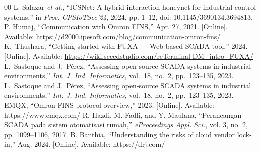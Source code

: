 \documentclass[conference]{IEEEtran}
\begin{document}
\begin{thebibliography}{00}
 L. Salazar \textit{et al.}, ``ICSNet: A hybrid-interaction honeynet for industrial control systems,'' in \textit{Proc. CPSIoTSec’24}, 2024, pp. 1–12, doi: 10.1145/3690134.3694813.
 P. Humaj, ``Communication with Omron FINS,'' Apr. 27, 2021. [Online]. Available: https://d2000.ipesoft.com/blog/communication-omron-fins/
 K.~Thushara, ``Getting started with FUXA — Web based SCADA tool,'' 2024. [Online]. Available: \url{https://wiki.seeedstudio.com/reTerminal-DM_intro_FUXA/}
 L.~Sastoque and J.~Pérez, ``Assessing open-source SCADA systems in industrial environments,''
\textit{Int. J. Ind. Informatics}, vol.~18, no.~2, pp.~123--135, 2023.
L.~Sastoque and J.~Pérez, ``Assessing open-source SCADA systems in industrial environments,'' 
\textit{Int. J. Ind. Informatics}, vol.~18, no.~2, pp.~123--135, 2023.
 EMQX, ``Omron FINS protocol overview,'' 2023. [Online]. Available: https://www.emqx.com/
 R. Hazdi, M. Fadli, and Y. Maulana, ``Perancangan SCADA pada sistem otomatisasi rumah,'' \textit{eProceedings Appl. Sci.}, vol. 3, no. 2, pp. 1099–1106, 2017.
 B. Banthia, ``Understanding the risks of cloud vendor lock-in,'' Aug. 2024. [Online]. Available: https://drj.com/
\end{thebibliography}
\end{document}
